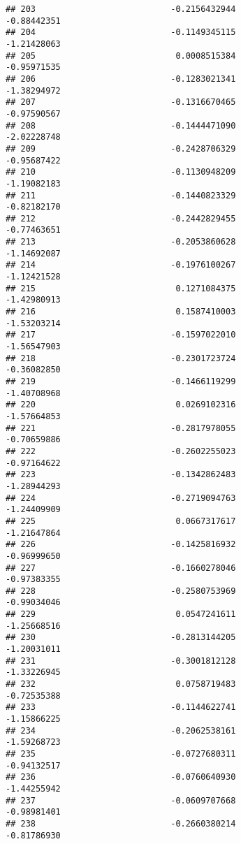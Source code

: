 \documentclass[
]{article}
\begin{document}
\begin{verbatim}
## 203                           -0.2156432944                -0.88442351
## 204                           -0.1149345115                -1.21428063
## 205                            0.0008515384                -0.95971535
## 206                           -0.1283021341                -1.38294972
## 207                           -0.1316670465                -0.97590567
## 208                           -0.1444471090                -2.02228748
## 209                           -0.2428706329                -0.95687422
## 210                           -0.1130948209                -1.19082183
## 211                           -0.1440823329                -0.82182170
## 212                           -0.2442829455                -0.77463651
## 213                           -0.2053860628                -1.14692087
## 214                           -0.1976100267                -1.12421528
## 215                            0.1271084375                -1.42980913
## 216                            0.1587410003                -1.53203214
## 217                           -0.1597022010                -1.56547903
## 218                           -0.2301723724                -0.36082850
## 219                           -0.1466119299                -1.40708968
## 220                            0.0269102316                -1.57664853
## 221                           -0.2817978055                -0.70659886
## 222                           -0.2602255023                -0.97164622
## 223                           -0.1342862483                -1.28944293
## 224                           -0.2719094763                -1.24409909
## 225                            0.0667317617                -1.21647864
## 226                           -0.1425816932                -0.96999650
## 227                           -0.1660278046                -0.97383355
## 228                           -0.2580753969                -0.99034046
## 229                            0.0547241611                -1.25668516
## 230                           -0.2813144205                -1.20031011
## 231                           -0.3001812128                -1.33226945
## 232                            0.0758719483                -0.72535388
## 233                           -0.1144622741                -1.15866225
## 234                           -0.2062538161                -1.59268723
## 235                           -0.0727680311                -0.94132517
## 236                           -0.0760640930                -1.44255942
## 237                           -0.0609707668                -0.98981401
## 238                           -0.2660380214                -0.81786930

\end{verbatim}
\end{document}

